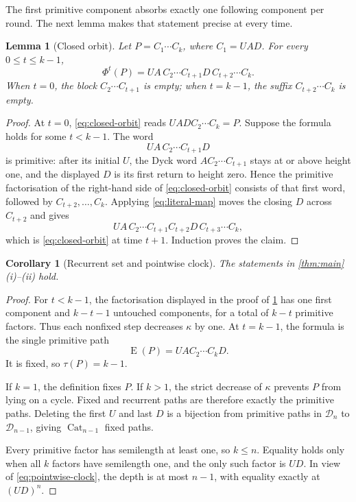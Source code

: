 \documentclass[10pt,a4paper]{amsart}
\newtheorem{lemma}[theorem]{Lemma}
\newtheorem{corollary}[theorem]{Corollary}
\theoremstyle{definition}
\theoremstyle{remark}
\newcommand{\Dyck}{\mathcal D}
\newcommand{\PhiMap}{\Phi}
\newcommand{\End}{\operatorname E}
\newcommand{\Cat}{\operatorname{Cat}}
\newcommand{\fac}{\kappa}
\begin{document}
The first primitive component absorbs exactly one following component per
round.  The next lemma makes that statement precise at every time.

\begin{lemma}[Closed orbit]\label{lem:closed-orbit}
Let $P=C_1\cdots C_k$, where $C_1=UAD$.  For every
$0\leq t\leq k-1$,
\begin{equation}\label{eq:closed-orbit}
 \PhiMap^t(P)=UA\,C_2\cdots C_{t+1}D\,
                         C_{t+2}\cdots C_k.
\end{equation}
When $t=0$, the block $C_2\cdots C_{t+1}$ is empty; when $t=k-1$, the
suffix $C_{t+2}\cdots C_k$ is empty.
\end{lemma}

\begin{proof}
At $t=0$, \eqref{eq:closed-orbit} reads
$UADC_2\cdots C_k=P$.  Suppose the formula holds for some $t<k-1$.
The word
\[
                         UA\,C_2\cdots C_{t+1}D
\]
is primitive: after its initial $U$, the Dyck word
$AC_2\cdots C_{t+1}$ stays at or above height one, and the displayed $D$ is
its first return to height zero.  Hence the primitive factorisation of the
right-hand side of \eqref{eq:closed-orbit} consists of that first word,
followed by $C_{t+2},\ldots,C_k$.  Applying \eqref{eq:literal-map} moves the
closing $D$ across $C_{t+2}$ and gives
\[
          UA\,C_2\cdots C_{t+1}C_{t+2}D\,
                         C_{t+3}\cdots C_k,
\]
which is \eqref{eq:closed-orbit} at time $t+1$.  Induction proves the claim.
\end{proof}

\begin{corollary}[Recurrent set and pointwise clock]\label{cor:clock}
The statements in \cref{thm:main}(i)--(ii) hold.
\end{corollary}

\begin{proof}
For $t<k-1$, the factorisation displayed in the proof of
\cref{lem:closed-orbit} has one first component and
$k-t-1$ untouched components, for a total of $k-t$ primitive factors.  Thus
each nonfixed step decreases $\fac$ by one.  At $t=k-1$, the formula is the
single primitive path
\begin{equation}\label{eq:endpoint-formula}
                         \End(P)=UAC_2\cdots C_kD.
\end{equation}
It is fixed, so $\tau(P)=k-1$.

If $k=1$, the definition fixes $P$.  If $k>1$, the strict decrease of $\fac$
prevents $P$ from lying on a cycle.  Fixed and recurrent paths are therefore
exactly the primitive paths.  Deleting the first $U$ and last $D$ is a
bijection from primitive paths in $\Dyck_n$ to $\Dyck_{n-1}$, giving
$\Cat_{n-1}$ fixed paths.

Every primitive factor has semilength at least one, so $k\leq n$.  Equality
holds only when all $k$ factors have semilength one, and the only such factor
is $UD$.  In view of \eqref{eq:pointwise-clock}, the depth is at most $n-1$,
with equality exactly at $(UD)^n$.
\end{proof}
\end{document}
